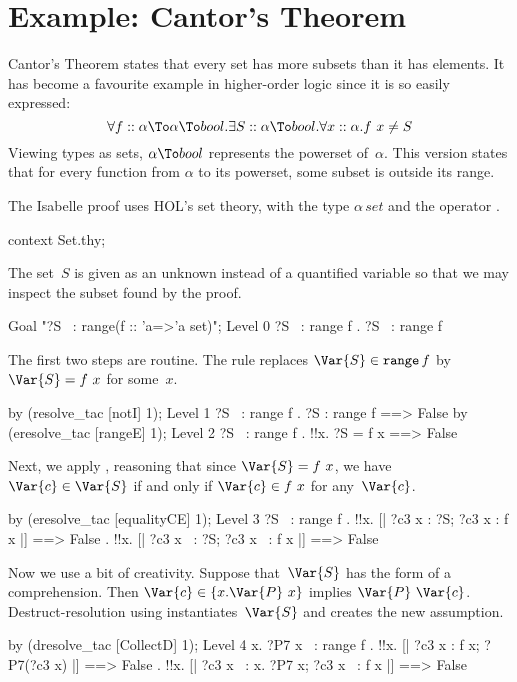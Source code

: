 

\section{Example: Cantor's Theorem}\label{sec:hol-cantor}
Cantor's Theorem states that every set has more subsets than it has
elements.  It has become a favourite example in higher-order logic since
it is so easily expressed:
\[  \forall f::\alpha \To \alpha \To bool. \exists S::\alpha\To bool.
    \forall x::\alpha. f~x \not= S 
\] 
%
Viewing types as sets, $\alpha\To bool$ represents the powerset
of~$\alpha$.  This version states that for every function from $\alpha$ to
its powerset, some subset is outside its range.  

The Isabelle proof uses HOL's set theory, with the type $\alpha\,set$ and
the operator .
\begin{ttbox}
context Set.thy;
\end{ttbox}
The set~$S$ is given as an unknown instead of a
quantified variable so that we may inspect the subset found by the proof.
\begin{ttbox}
Goal "?S ~: range\thinspace(f :: 'a=>'a set)";
{\out Level 0}
{\out ?S ~: range f}
{. ?S ~: range f}
\end{ttbox}
The first two steps are routine.  The rule  replaces
$\Var{S}\in \texttt{range} \, f$ by $\Var{S}=f~x$ for some~$x$.
\begin{ttbox}
by (resolve_tac [notI] 1);
{\out Level 1}
{\out ?S ~: range f}
{. ?S : range f ==> False}
\ttbreak
by (eresolve_tac [rangeE] 1);
{\out Level 2}
{\out ?S ~: range f}
{. !!x. ?S = f x ==> False}
\end{ttbox}
Next, we apply , reasoning that since $\Var{S}=f~x$,
we have $\Var{c}\in \Var{S}$ if and only if $\Var{c}\in f~x$ for
any~$\Var{c}$.
\begin{ttbox}
by (eresolve_tac [equalityCE] 1);
{\out Level 3}
{\out ?S ~: range f}
{. !!x. [| ?c3 x : ?S; ?c3 x : f x |] ==> False}
{. !!x. [| ?c3 x ~: ?S; ?c3 x ~: f x |] ==> False}
\end{ttbox}
Now we use a bit of creativity.  Suppose that~$\Var{S}$ has the form of a
comprehension.  Then $\Var{c}\in\{x.\Var{P}~x\}$ implies
$\Var{P}~\Var{c}$.   Destruct-resolution using 
instantiates~$\Var{S}$ and creates the new assumption.
\begin{ttbox}
by (dresolve_tac [CollectD] 1);
{\out Level 4}
{\out {\ttlbrace}x. ?P7 x{\ttrbrace} ~: range f}
{. !!x. [| ?c3 x : f x; ?P7(?c3 x) |] ==> False}
{. !!x. [| ?c3 x ~: {\ttlbrace}x. ?P7 x{\ttrbrace}; ?c3 x ~: f x |] ==> False}
\end{ttbox}
